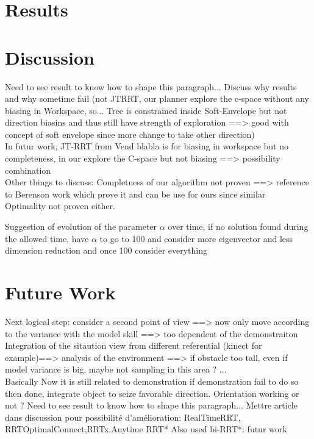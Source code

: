 \documentclass[letterpaper, 10 pt, conference]{ieeeconf}  %
\begin{document}
\section{Results}
\section{Discussion}
  Need to see result to know how to shape this paragraph...
Discuss why results and why sometime fail (not JTRRT, our planner explore the c-space without any biasing in Workspace, so... Tree is constrained inside Soft-Envelope but not direction biasins and thus still have strength of exploration ==> good with concept of soft envelope since more change to take other direction)\\

In futur work, JT-RRT from Vend blabla is for biasing in workspace but no completeness, in our explore the C-space but not biasing ==> possibility combination\\

Other things to discuss: Completness of our algorithm not proven ==> reference to Berenson work which prove it and can be use for ours since similar\\

Optimality not proven either.

Suggestion of evolution of the parameter $\alpha$ over time, if no solution found during the allowed time, have $\alpha$ to go to 100 and consider more eigenvector and less dimension reduction and once 100 consider everything \\

\section{Future Work}
Next logical step: consider a second point of view ==> now only move according to the variance with the model skill ==> too dependent of the demonstraiton
Integration of the sitaution view from different referential (kinect for example)==> analysis of the environment ==> if obstacle too tall, even if model variance is big, maybe not sampling in this area ? ... \\
Basically Now it is still related to demonstration if demonstration fail to do so then done, integrate object to seize favorable direction.
Orientation working or not ?  Need to see result to know how to shape this paragraph...
Mettre article dans discussion pour possibilité d'amélioration:
RealTimeRRT, RRTOptimalConnect,RRTx,Anytime RRT*
Also used bi-RRT*: futur work
\end{document}
